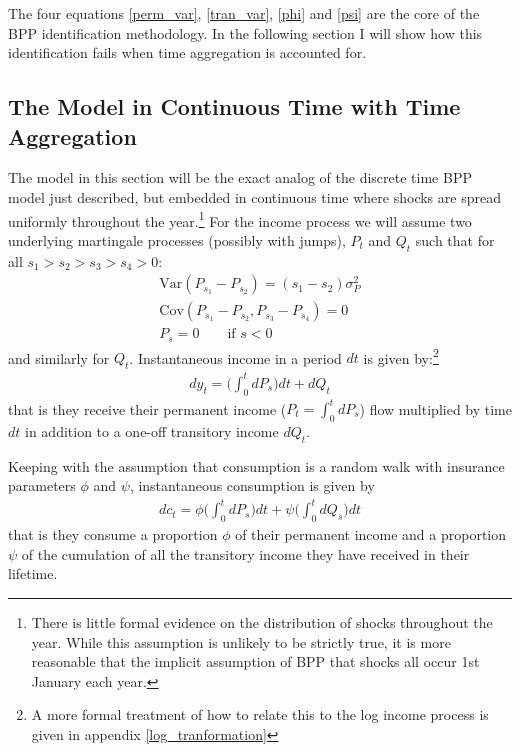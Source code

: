 \documentclass[titlepage]{\econtex}\newcommand{\texname}{BPP_TimeAgg}
\begin{document}
The four equations \ref{perm_var}, \ref{tran_var}, \ref{phi} and \ref{psi} are the core of the BPP identification methodology. In the following section I will show how this identification fails when time aggregation is accounted for.

\subsection{The Model in Continuous Time with Time Aggregation}
The model in this section will be the exact analog of the discrete time BPP model just described, but embedded in continuous time where shocks are spread uniformly throughout the year.\footnote{There is little formal evidence on the distribution of shocks throughout the year. While this assumption is unlikely to be strictly true, it is more reasonable that the implicit assumption of BPP that shocks all occur 1st January each year.} For the income process we will assume two underlying martingale processes (possibly with jumps), $P_t$ and $Q_t$ such that for all $s_1>s_2>s_3>s_4>0$:
\begin{align*}
\mathrm{Var}(P_{s_1}-P_{s_2})=(s_1-s_2)\sigma_P^2 \\
\mathrm{Cov}(P_{s_1}-P_{s_2},P_{s_3}-P_{s_4}) = 0 \\
P_s = 0 \qquad \text{if } s<0
\end{align*}
and similarly for $Q_t$.  Instantaneous income in a period $dt$ is given by:\footnote{A more formal treatment of how to relate this to the log income process is given in appendix \ref{log_tranformation}}
\begin{align}
dy_t = \Big( \int_{0}^{t}dP_s \Big) dt  +dQ_t \label{income_process}
\end{align}
that is they receive their permanent income ($P_t =\int_{0}^{t}dP_s $) flow multiplied by time $dt$ in addition to a one-off transitory income $dQ_t$.

Keeping with the assumption that consumption is a random walk with insurance parameters $\phi$ and $\psi$, instantaneous consumption is given by
\begin{align}
dc_t = \phi \Big( \int_{0}^{t} dP_s  \Big) dt +\psi\Big( \int_{0}^{t}dQ_s\Big) dt  \label{consumption_process}
\end{align}
that is they consume a proportion $\phi$ of their permanent income and a proportion $\psi$ of the cumulation of all the transitory income they have received in their lifetime.
\end{document}

